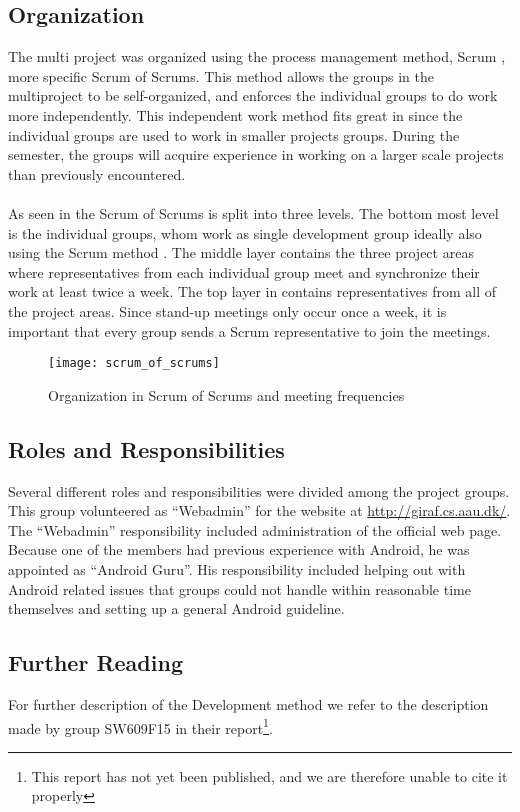 \subsection{Organization}
The multi project was organized using the process management method, Scrum \parencite{scrum}, more specific Scrum of Scrums. This method allows the groups in the multiproject to be self-organized, and enforces the individual groups to do work more independently. This independent work method fits great in since the individual groups are used to work in smaller projects groups. During the semester, the groups will acquire experience in working on a larger scale projects than previously encountered.
\\\\
As seen in  the Scrum of Scrums is split into three levels.  The bottom most level is the individual groups, whom work as single development group ideally also using the Scrum method .  The middle layer contains the three project areas where representatives from each individual group meet and synchronize their work at least twice a week. The top layer in  contains representatives from all of the project areas. Since stand-up meetings only occur once a week, it is important that every group sends a Scrum representative to join the meetings.

\begin{figure}[!htbp]
  \centering
    \texttt{[image: scrum\_of\_scrums]}
    \caption{Organization in Scrum of Scrums and meeting frequencies}
    \label{fig:scrum_of_scrums}
\end{figure}

\subsection{Roles and Responsibilities}
Several different roles and responsibilities were divided among the project groups. This group volunteered as ``Webadmin'' for the website at \url{http://giraf.cs.aau.dk/}. The ``Webadmin'' responsibility included administration of the official \giraf web page. Because one of the members had previous experience with Android, he was appointed as ``Android Guru''. His responsibility included helping out with Android related issues that groups could not handle within reasonable time themselves and setting up a general Android guideline.

\subsection{Further Reading}
For further description of the \giraf Development method we refer to the description made by group SW609F15 in their report\footnote{This report has not yet been published, and we are therefore unable to cite it properly}.